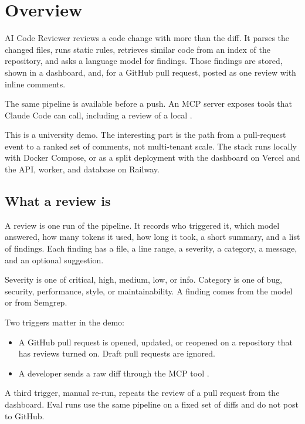 \chapter{Overview}

AI Code Reviewer reviews a code change with more than the diff. It parses the changed files, runs static rules, retrieves similar code from an index of the repository, and asks a language model for findings. Those findings are stored, shown in a dashboard, and, for a GitHub pull request, posted as one review with inline comments.

The same pipeline is available before a push. An MCP server exposes tools that Claude Code can call, including a review of a local .

This is a university demo. The interesting part is the path from a pull-request event to a ranked set of comments, not multi-tenant scale. The stack runs locally with Docker Compose, or as a split deployment with the dashboard on Vercel and the API, worker, and database on Railway.

\section{What a review is}

A review is one run of the pipeline. It records who triggered it, which model answered, how many tokens it used, how long it took, a short summary, and a list of findings. Each finding has a file, a line range, a severity, a category, a message, and an optional suggestion.

Severity is one of critical, high, medium, low, or info. Category is one of bug, security, performance, style, or maintainability. A finding comes from the model or from Semgrep.

Two triggers matter in the demo:

\begin{itemize}
  \item A GitHub pull request is opened, updated, or reopened on a repository that has reviews turned on. Draft pull requests are ignored.
  \item A developer sends a raw diff through the MCP tool .
\end{itemize}

A third trigger, manual re-run, repeats the review of a pull request from the dashboard. Eval runs use the same pipeline on a fixed set of diffs and do not post to GitHub.

